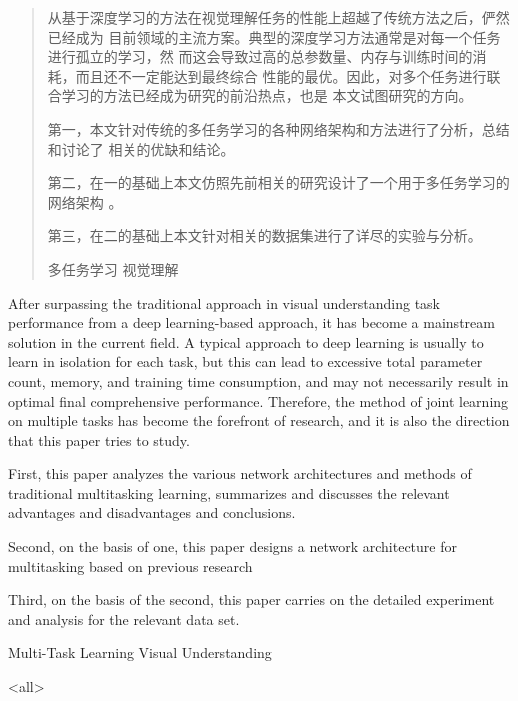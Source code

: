 \documentclass[../main]{subfiles}
\begin{document}
\mode*

\begin{abstract}
  从基于深度学习的方法在视觉理解任务的性能上超越了传统方法之后，俨然已经成为
  目前领域的主流方案。典型的深度学习方法通常是对每一个任务进行孤立的学习，然
  而这会导致过高的总参数量、内存与训练时间的消耗，而且还不一定能达到最终综合
  性能的最优。因此，对多个任务进行联合学习的方法已经成为研究的前沿热点，也是
  本文试图研究的方向。

  第一，本文针对传统的多任务学习的各种网络架构和方法进行了分析，总结和讨论了
  相关的优缺和结论。

  第二，在一的基础上本文仿照先前相关的研究设计了一个用于多任务学习的网络架构
  。

  第三，在二的基础上本文针对相关的数据集进行了详尽的实验与分析。

\begin{keyword}
  多任务学习 视觉理解
\end{keyword}
\end{abstract}

\begin{abstract*}
  After surpassing the traditional approach in visual understanding task
  performance from a deep learning-based approach, it has become a mainstream
  solution in the current field. A typical approach to deep learning is
  usually to learn in isolation for each task, but this can lead to excessive
  total parameter count, memory, and training time consumption, and may not
  necessarily result in optimal final comprehensive performance. Therefore,
  the method of joint learning on multiple tasks has become the forefront of
  research, and it is also the direction that this paper tries to study.

  First, this paper analyzes the various network architectures and methods of
  traditional multitasking learning, summarizes and discusses the relevant
  advantages and disadvantages and conclusions.

  Second, on the basis of one, this paper designs a network architecture for
  multitasking based on previous research

  Third, on the basis of the second, this paper carries on the detailed
  experiment and analysis for the relevant data set.

\begin{keyword*}
  Multi-Task Learning Visual Understanding
\end{keyword*}
\end{abstract*}

\mode<all>
\end{document}
